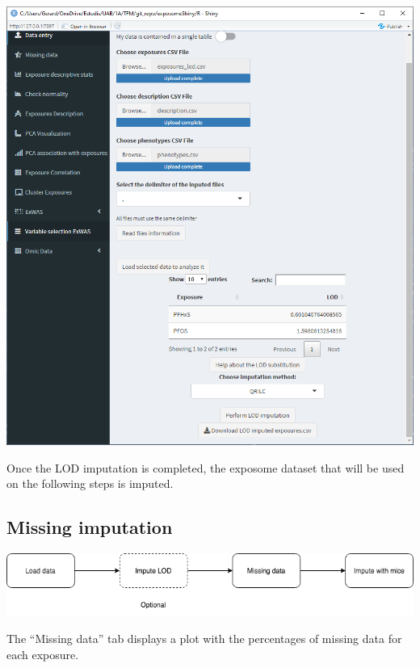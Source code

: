 \documentclass[
]{book}
\begin{document}
\includegraphics{images/analysis1_2_5.png}

Once the LOD imputation is completed, the exposome dataset that will be used on the following steps is imputed.

\hypertarget{missing-imputation}{%
\subsection{Missing imputation}\label{missing-imputation}}

\includegraphics{images/analysis2_1.png}

The ``Missing data'' tab displays a plot with the percentages of missing data for each exposure.
\end{document}
